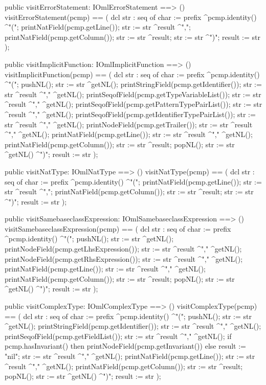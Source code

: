 \begin{vdm_al}
  public visitErrorStatement: IOmlErrorStatement ==> ()
  visitErrorStatement(pcmp) ==
    ( dcl str : seq of char := prefix ^pcmp.identity() ^"(";
      printNatField(pcmp.getLine());
      str := str ^result ^",";
      printNatField(pcmp.getColumn());
      str := str ^result;
      str := str ^")";
      result := str );

  public visitImplicitFunction: IOmlImplicitFunction ==> ()
  visitImplicitFunction(pcmp) ==
    ( dcl str : seq of char := prefix ^pcmp.identity() ^"(";
      pushNL();
      str := str ^getNL();
      printStringField(pcmp.getIdentifier());
      str := str ^result ^"," ^getNL();
      printSeqofField(pcmp.getTypeVariableList());
      str := str ^result ^"," ^getNL();
      printSeqofField(pcmp.getPatternTypePairList());
      str := str ^result ^"," ^getNL();
      printSeqofField(pcmp.getIdentifierTypePairList());
      str := str ^result ^"," ^getNL();
      printNodeField(pcmp.getTrailer());
      str := str ^result ^"," ^getNL();
      printNatField(pcmp.getLine());
      str := str ^result ^"," ^getNL();
      printNatField(pcmp.getColumn());
      str := str ^result;
      popNL();
      str := str ^getNL() ^")";
      result := str );

  public visitNatType: IOmlNatType ==> ()
  visitNatType(pcmp) ==
    ( dcl str : seq of char := prefix ^pcmp.identity() ^"(";
      printNatField(pcmp.getLine());
      str := str ^result ^",";
      printNatField(pcmp.getColumn());
      str := str ^result;
      str := str ^")";
      result := str );

  public visitSamebaseclassExpression: IOmlSamebaseclassExpression ==> ()
  visitSamebaseclassExpression(pcmp) ==
    ( dcl str : seq of char := prefix ^pcmp.identity() ^"(";
      pushNL();
      str := str ^getNL();
      printNodeField(pcmp.getLhsExpression());
      str := str ^result ^"," ^getNL();
      printNodeField(pcmp.getRhsExpression());
      str := str ^result ^"," ^getNL();
      printNatField(pcmp.getLine());
      str := str ^result ^"," ^getNL();
      printNatField(pcmp.getColumn());
      str := str ^result;
      popNL();
      str := str ^getNL() ^")";
      result := str );

  public visitComplexType: IOmlComplexType ==> ()
  visitComplexType(pcmp) ==
    ( dcl str : seq of char := prefix ^pcmp.identity() ^"(";
      pushNL();
      str := str ^getNL();
      printStringField(pcmp.getIdentifier());
      str := str ^result ^"," ^getNL();
      printSeqofField(pcmp.getFieldList());
      str := str ^result ^"," ^getNL();
      if pcmp.hasInvariant()
      then printNodeField(pcmp.getInvariant())
      else result := "nil";
      str := str ^result ^"," ^getNL();
      printNatField(pcmp.getLine());
      str := str ^result ^"," ^getNL();
      printNatField(pcmp.getColumn());
      str := str ^result;
      popNL();
      str := str ^getNL() ^")";
      result := str );


\end{vdm_al}

